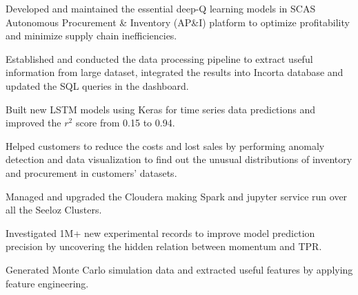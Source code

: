 \documentclass[letterpaper]{deedy-resume-openfont}
\begin{document}
\begin{tightemize}
    \item Developed and maintained the essential deep-Q learning models in SCAS Autonomous Procurement \& Inventory (AP\&I) platform to optimize profitability and minimize supply chain inefficiencies.
    \item Established and conducted the data processing pipeline to extract useful information from large dataset, integrated the results into Incorta database and updated the SQL queries in the dashboard.
    \item Built new LSTM models using Keras for time series data predictions and improved the $r^2$ score from 0.15 to 0.94.
    \item Helped customers to reduce the costs and lost sales by performing anomaly detection and data visualization to find out the unusual distributions of inventory and procurement in customers' datasets.
    \item Managed and upgraded the Cloudera making Spark and jupyter service run over all the Seeloz Clusters.
\end{tightemize}
\sectionsep

\begin{tightemize}
\item Investigated 1M+ new experimental records to improve model prediction precision by uncovering the hidden relation between momentum and TPR.
\item Generated Monte Carlo simulation data and extracted useful features by applying feature engineering.
\end{tightemize}
\sectionsep
\end{document}
